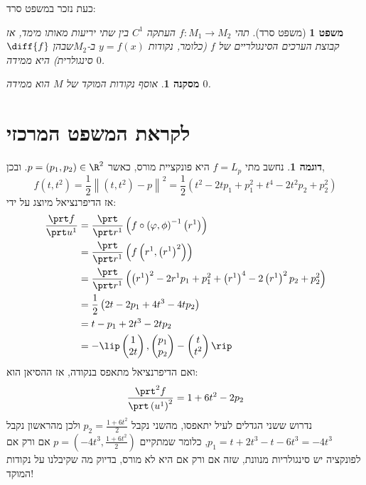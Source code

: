 \documentclass{article}
\newtheorem*{corollary*}{מסקנה}
\newtheorem*{theorem*}{משפט}
\theoremstyle{definition}
\newtheorem*{example*}{דוגמה}
\newcommand{\norm}[1]{\left\lVert#1\right\rVert}
\begin{document}
	כעת נזכר במשפט סרד:
	\begin{theorem*}[משפט סרד]
		תהי
		\(f:M_1\to M_2\)
		העתקה
		\(C^1\)
		בין שתי יריעות מאותו מימד,
		אז קבוצת הערכים הסינגולריים של \(f\)
		(כלומר, נקודות \(y=f(x)\) ב-\(M_2\)שבהן \(\diff{f}\) סינגולרית)
		היא ממידה \(0\).
	\end{theorem*}

	\begin{corollary*}
		אוסף נקודות המוקד של \(M\) הוא ממידה \(0\).
	\end{corollary*}




	\section{לקראת המשפט המרכזי}
	\begin{example*}
		נחשב מתי
		\(f=L_p\)
		היא פונקציית מורס, כאשר
		\(p=(p_1,p_2)\in \R^2\).
		ובכן,
		\[
			f(t,t^2)
			=\frac{1}{2}\norm{(t,t^2)-p}^2
			=\frac{1}{2}\left(t^2-2tp_1+p_1^2+t^4-2t^2p_2+p_2^2\right)
		\]
		אז הדיפרנציאל מיוצג על ידי:
		\begin{equation*}\begin{split}
			\frac{\prt f}{\prt u^1}
			&=\frac{\prt}{\prt r^1}\left(f\circ\left(\varphi,\phi\right)^{-1}\left(r^1\right)\right)
			\\&=\frac{\prt}{\prt r^1}\left(f\left(r^1,\left(r^1\right)^2\right)\right)
			\\&=\frac{\prt}{\prt r^1}\left(\left(r^1\right)^2-2r^1 p_1+p_1^2+\left(r^1\right)^4-2\left(r^1\right)^2p_2+p_2^2\right)
			\\&=\frac{1}{2}\left(2t-2p_1+4t^3-4tp_2\right)
			\\&=t-p_1+2t^3-2tp_2
			\\&=-\lip
				\begin{pmatrix}
					1 \\ 2t
				\end{pmatrix},
				\begin{pmatrix}
					p_1 \\ p_2
				\end{pmatrix}
				-\begin{pmatrix}
					t \\ t^2
				\end{pmatrix}
			\rip
		\end{split}\end{equation*}
		ואם הדיפרנציאל מתאפס בנקודה, אז ההסיאן הוא:
		\[
			\frac{\prt^2 f}{\prt \left(u^1\right)^2}
			=1+6t^2-2p_2
		\]
		נדרוש ששני הגדלים לעיל יתאפסו, מהשני נקבל
		\(p_2=\frac{1+6t^2}{2}\)
		ולכן מהראשון נקבל
		\(p_1=t+2t^3-t-6t^3=-4t^3\),
		כלומר שמתקיים
		\(p=\left(-4t^3,\frac{1+6t^2}{2}\right)\)
		אם ורק אם לפונקציה יש סינגולריות מנוונת, שזה אם ורק אם היא לא מורס,
		בדיוק מה שקיבלנו על נקודות המוקד!
	\end{example*}
\end{document}
